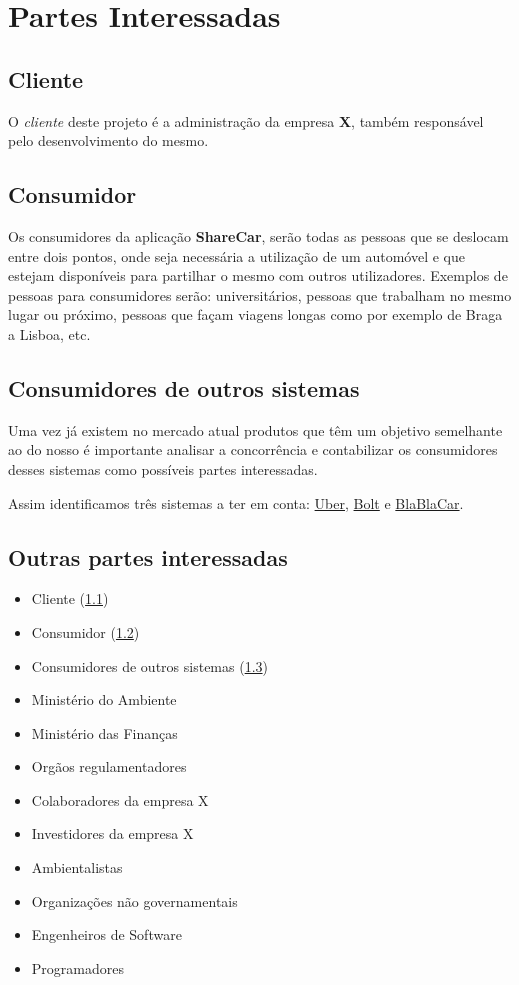 \chapter{Partes Interessadas}
\section{Cliente}\label{0:0.2.1}
\hspace{5mm} O \emph{cliente} deste projeto é a administração da empresa \textbf{X}, também responsável pelo desenvolvimento do mesmo.

\section{Consumidor}\label{0:0.2.2}
\hspace{5mm} Os consumidores da aplicação \textbf{ShareCar}, serão todas as pessoas que se deslocam entre dois pontos, onde seja necessária a utilização de um automóvel e que estejam disponíveis para partilhar o mesmo com outros utilizadores. Exemplos de pessoas para consumidores serão: universitários, pessoas que trabalham no mesmo lugar ou próximo, pessoas que façam viagens longas como por exemplo de Braga a Lisboa, etc.

\section{Consumidores de outros sistemas}\label{0:0.2.3}

\hspace{5mm} Uma vez já existem no mercado atual produtos que têm um objetivo semelhante ao do nosso é importante analisar a concorrência e contabilizar os consumidores desses sistemas como possíveis partes interessadas.

\hspace{5mm} Assim identificamos três sistemas a ter em conta: \href{https://www.uber.com}{Uber}, \href{https://bolt.eu/en/}{Bolt} e \href{https://www.blablacar.pt/}{BlaBlaCar}. 


\section{Outras partes interessadas}
\begin{itemize}
    \item Cliente (\ref{0:0.2.1})
    \item Consumidor (\ref{0:0.2.2})
    \item Consumidores de outros sistemas (\ref{0:0.2.3})
    \item Ministério do Ambiente
    \item Ministério das Finanças
    \item Orgãos regulamentadores
    \item Colaboradores da empresa X
    \item Investidores da empresa X
    \item Ambientalistas
    \item Organizações não governamentais
    \item Engenheiros de Software
    \item Programadores
\end{itemize}

